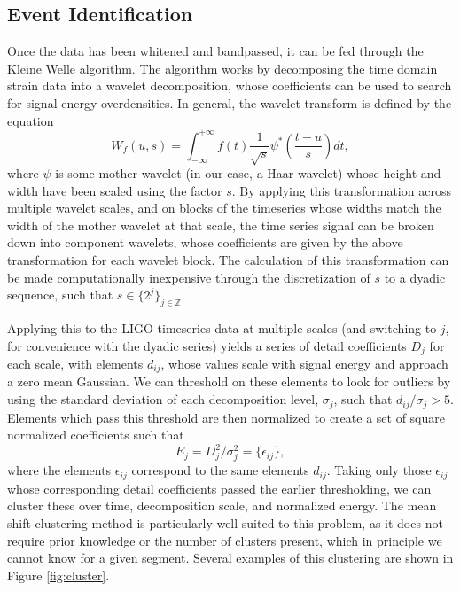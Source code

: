 \documentclass{article}
\begin{document}
\subsection{Event Identification}
Once the data has been whitened and bandpassed, it can be fed through the Kleine Welle algorithm. The algorithm works by decomposing the time domain strain data into a wavelet decomposition, whose coefficients can be used to search for signal energy overdensities\citep{Biswas2013}\citep{Blackburn2007}. In general, the wavelet transform is defined by the equation\citep{Blackburn2007}\citep{Mallat1999}
\begin{equation}
W_{f}(u,s)=\int_{-\infty}^{+\infty}f(t)\frac{1}{\sqrt{s}}\psi^{*}\left(\frac{t-u}{s}\right)dt, \label{eq:wavtr}
\end{equation}
where $\psi$ is some mother wavelet (in our case, a Haar wavelet) whose height and width have been scaled using the factor $s$. By applying this transformation across multiple wavelet scales, and on blocks of the timeseries whose widths match the width of the mother wavelet at that scale, the time series signal can be broken down into component wavelets, whose coefficients are given by the above transformation for each wavelet block. The calculation of this transformation can be made computationally inexpensive through the discretization of $s$ to a dyadic sequence, such that $s \in \{2^{j}\}_{j\in\mathbb{Z}}$\citep{Blackburn2007}\citep{Mallat1999}.

Applying this to the LIGO timeseries data at multiple scales (and switching to $j$, for convenience with the dyadic series) yields a series of detail coefficients $D_{j}$ for each scale, with elements $d_{ij}$, whose values scale with signal energy and approach a zero mean Gaussian\citep{Blackburn2007}. We can threshold on these elements to look for outliers by using the standard deviation of each decomposition level, $\sigma_{j}$, such that $d_{ij}/\sigma_{j} > 5$. Elements which pass this threshold are then normalized to create a set of square normalized coefficients such that
\begin{equation}
E_{j} = D_{j}^{2}/\sigma_{j}^{2} = \{\epsilon_{ij}\},
\end{equation}
where the elements $\epsilon_{ij}$ correspond to the same elements $d_{ij}$. Taking only those $\epsilon_{ij}$ whose corresponding detail coefficients passed the earlier thresholding, we can cluster these over time, decomposition scale, and normalized energy. The mean shift clustering method is particularly well suited to this problem, as it does not require prior knowledge or the number of clusters present\citep{Ivezic2014}, which in principle we cannot know for a given segment. Several examples of this clustering are shown in Figure \ref{fig:cluster}.
\end{document}
